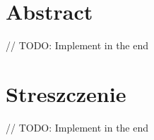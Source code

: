 \chapter*{Abstract}
// TODO: Implement in the end
\chapter*{Streszczenie}
// TODO: Implement in the end
